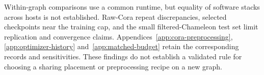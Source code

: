 Within-graph comparisons use a common runtime, but equality of software stacks across hosts is not established. Raw-Cora repeat discrepancies, selected checkpoints near the training cap, and the small filtered-Chameleon test set limit replication and convergence claims. Appendices~\ref{app:cora-preprocessing}, \ref{app:optimizer-history} and~\ref{app:matched-budget} retain the corresponding records and sensitivities. These findings do not establish a validated rule for choosing a sharing placement or preprocessing recipe on a new graph.
